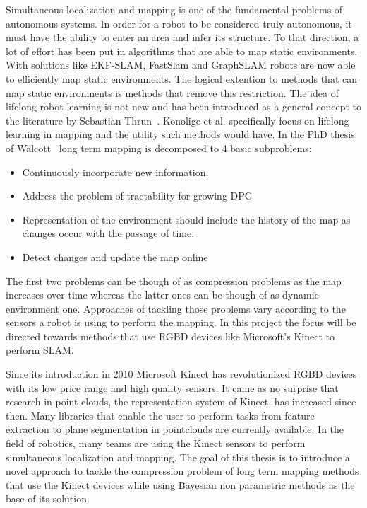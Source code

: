 \documentclass[twoside,hidelinks]{article}
\begin{document}
Simultaneous localization and mapping is one of the fundamental problems of autonomous systems\cite{probRobs}. In order for a robot to be considered truly autonomous, it must have the ability to enter an area and infer its structure. To that direction, a lot of effort has been put in algorithms that are able to map static environments. With solutions like EKF-SLAM\cite{ekf}, FastSlam\cite{slam} and GraphSLAM\cite{graph} robots are now able to efficiently map static environments. 
The logical extention to methods that can map  static environments is methods that remove this restriction. The idea of lifelong robot learning is not new and has been introduced as a general concept to the literature by Sebastian Thrun~\cite{liflonglearning}. Konolige et al.\cite{lifelongmaps} specifically focus on lifelong learning in mapping and the utility such methods would have.  In the PhD thesis of Walcott~\cite{aishalong} long term mapping is decomposed to 4 basic subproblems:
\begin{itemize}
	\item{Continuously incorporate new information.}
	\item{Address the problem of tractability for growing DPG}
	\item{Representation of the environment should include the history of the map as changes occur	with the passage of time.}
	\item{Detect changes and update the map online}
\end{itemize}

The first two problems can be though of as compression problems as the map increases over time whereas the latter ones can be though of as dynamic environment one. Approaches of tackling those problems vary according to the sensors a robot is using to perform the mapping. In this project the focus will be directed towards methods that use RGBD devices like Microsoft's Kinect to perform SLAM.

Since its introduction in 2010 Microsoft Kinect\cite{kinect} has revolutionized RGBD devices with its low price range and high quality sensors. It came as no surprise that research in point clouds, the representation system of Kinect, has increased since then. Many libraries that enable the user to perform tasks from feature extraction to plane segmentation\cite{pcl} in pointclouds are currently available. In the field of robotics, many teams are using the Kinect sensors to perform simultaneous localization and mapping\cite{rtabmap}. The goal of this thesis is to introduce a novel approach to tackle the compression problem of long term mapping methods that use the Kinect devices while using Bayesian non parametric methods as the base of its solution.
\end{document}
